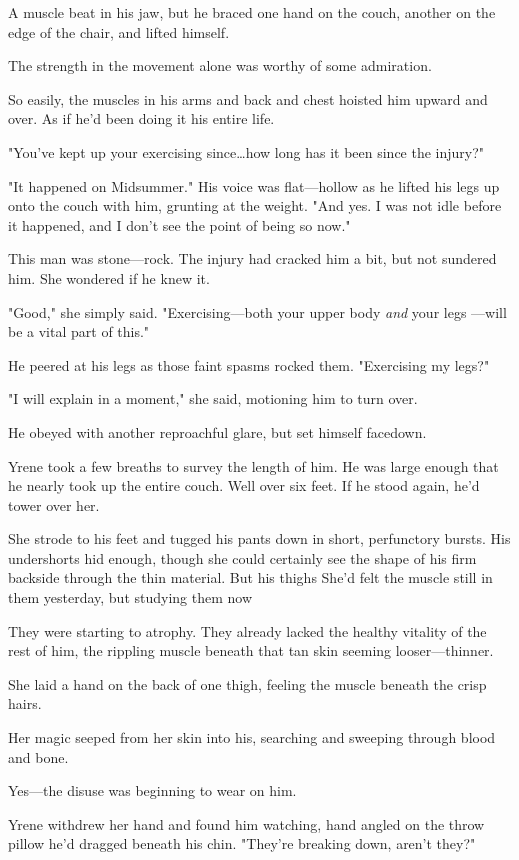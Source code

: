 A muscle beat in his jaw, but he braced one hand on the couch, another on the edge of the chair, and lifted himself.

The strength in the movement alone was worthy of some admiration.

So easily, the muscles in his arms and back and chest hoisted him upward and over.
As if he'd been doing it his entire life.

"You've kept up your exercising since\ldots how long has it been since the injury?"

"It happened on Midsummer."
His voice was flat---hollow as he lifted his legs up onto the couch with him, grunting at the weight.
"And yes.
I was not idle before it happened, and I don't see the point of being so now."

This man was stone---rock.
The injury had cracked him a bit, but not sundered him.
She wondered if he knew it.

"Good," she simply said.
"Exercising---both your upper body \emph{and} your legs ---will be a vital part of this."

He peered at his legs as those faint spasms rocked them.
"Exercising my legs?"

"I will explain in a moment," she said, motioning him to turn over.

He obeyed with another reproachful glare, but set himself facedown.

Yrene took a few breaths to survey the length of him.
He was large enough that he nearly took up the entire couch.
Well over six feet.
If he stood again, he'd tower over her.

She strode to his feet and tugged his pants down in short, perfunctory bursts.
His undershorts hid enough, though she could certainly see the shape of his firm backside through the thin material.
But his thighs  She'd felt the muscle still in them yesterday, but studying them now 

They were starting to atrophy.
They already lacked the healthy vitality of the rest of him, the rippling muscle beneath that tan skin seeming looser---thinner.

She laid a hand on the back of one thigh, feeling the muscle beneath the crisp hairs.

Her magic seeped from her skin into his, searching and sweeping through blood and bone.

Yes---the disuse was beginning to wear on him.

Yrene withdrew her hand and found him watching, hand angled on the throw pillow he'd dragged beneath his chin.
"They're breaking down, aren't they?"


